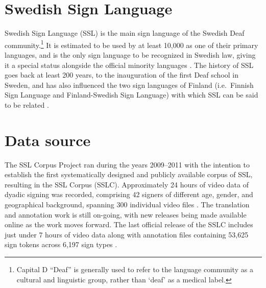\documentclass[11pt]{article}
\begin{document}
\section{Swedish Sign Language}

Swedish Sign Language (SSL) is the main sign language of the Swedish Deaf community.\footnote{Capital D ``Deaf'' is generally used to refer to the language community as a cultural and linguistic group, rather than `deaf' as a medical label.} It is estimated to be used by at least 10,000 as one of their primary languages, and is the only sign language to be recognized in Swedish law, giving it a special status alongside the official minority languages \cite{Ahlgren2006sou,Parkvall2015siffror}. The history of SSL goes back at least 200 years, to the inauguration of the first Deaf school in Sweden, and has also influenced the two sign languages of Finland (i.e.~Finnish Sign Language and Finland-Swedish Sign Language) with which SSL can be said to be related \cite{Bergman2010transmission}.

\section{Data source}

The SSL Corpus Project ran during the years 2009--2011 with the intention to establish the first systematically designed and publicly available corpus of SSL, resulting in the SSL Corpus (SSLC). Approximately 24 hours of video data of dyadic signing was recorded, comprising 42 signers of different age, gender, and geographical background, spanning 300 individual video files \cite{Mesch2012signed}. The translation and annotation work is still on-going, with new releases being made available online as the work moves forward. The last official release of the SSLC includes just under 7 hours of video data \cite{Mesch2012dataset} along with annotation files containing 53,625 sign tokens across 6,197 sign types \cite{Mesch2016annotated}. 
\end{document}
